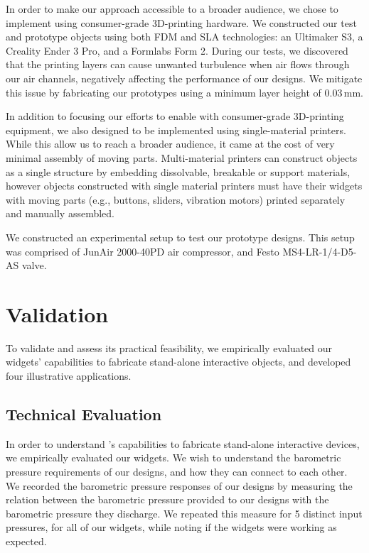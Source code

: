     In order to make our approach accessible to a broader audience, we
    chose to implement \al using consumer-grade 3D-printing hardware. We
    constructed our test and prototype objects using both FDM and SLA
    technologies: an Ultimaker S3, a Creality Ender 3 Pro, and a Formlabs
    Form 2. During our tests, we discovered that the printing layers can cause
    unwanted turbulence when air flows through our air channels, negatively
    affecting the performance of our designs. We mitigate this issue by
    fabricating our prototypes using a minimum layer height of 0.03\,mm. 

    In addition to focusing our efforts to enable \al with consumer-grade
    3D-printing equipment, we also designed \al to be implemented using
    single-material printers. While this allow us to reach a broader
    audience, it came at the cost of very minimal assembly of moving parts.
    Multi-material printers can construct \al objects as a single structure
    by embedding dissolvable, breakable or 
    support materials, however \al objects constructed with single material
    printers must have their widgets with moving parts (e.g., buttons,
    sliders, vibration motors) printed separately and manually assembled.

    We constructed an experimental setup to test our \al prototype designs.
    This setup was comprised of JunAir 2000-40PD air compressor, and Festo
    MS4-LR-1/4-D5-AS valve.

  \section{Validation}
    To validate \al and assess its practical feasibility, we empirically
    evaluated our widgets' capabilities to fabricate stand-alone
    interactive objects, and developed four illustrative applications.

    \subsection{Technical Evaluation}
      In order to understand \al's capabilities to fabricate stand-alone
      interactive devices, we empirically evaluated our widgets. We wish to
      understand the barometric pressure requirements of our designs, and
      how they can connect to each other. We recorded the barometric
      pressure responses of our designs by measuring the relation between
      the barometric pressure provided to our designs with the barometric
      pressure they discharge. We repeated this measure for 5 distinct
      input pressures, for all of our widgets, while noting if the widgets
      were working as expected.
      
